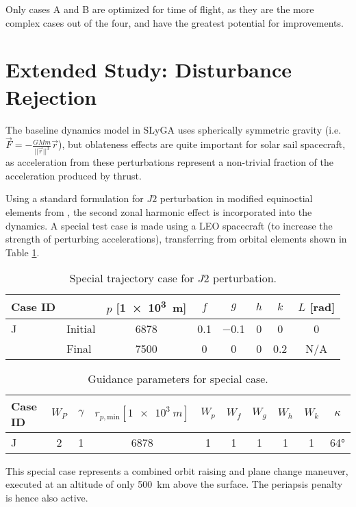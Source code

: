 Only cases A and B are optimized for time of flight, as they are the more complex cases out of the four, and have the greatest potential for improvements.

\section{Extended Study: Disturbance Rejection}
The baseline dynamics model in SLyGA uses spherically symmetric gravity (i.e. \(\vec{F} = -\frac{GMm}{||\vec{r}||^3} \vec{r}\)), but oblateness effects are quite important for solar sail spacecraft, as acceleration from these perturbations represent a non-trivial fraction of the acceleration produced by thrust.

Using a standard formulation for \(J2\) perturbation in modified equinoctial elements from \cite{nasa_mpg_moe}, the second zonal harmonic effect is incorporated into the dynamics. A special test case is made using a LEO spacecraft (to increase the strength of perturbing accelerations), transferring from orbital elements shown in Table \ref{tab:trajectory_case_J}.

\begin{table}[H]
  \centering
  \begin{tabular}{llcccccc}
    \toprule
    \textbf{Case ID} &         & \(p\) [\qty{1e3}{m}] & \(f\)     & \(g\)      & \(h\)   & \(k\)     & \(L\) [\unit{rad}] \\
    \midrule
    J                & Initial & \num{6878}           & \num{0.1} & \num{-0.1} & \num{0} & \num{0}   & \num{0}            \\
                     & Final   & \num{7500}           & \num{0}   & \num{0}    & \num{0} & \num{0.2} & N/A                \\

    \bottomrule
  \end{tabular}
  \caption{Special trajectory case for \(J2\) perturbation.}
  \label{tab:trajectory_case_J}
\end{table}

\begin{table}[H]
  \centering
  \begin{tabular}{lccccccccc}
    \toprule
    \textbf{Case ID} & \(W_P\) & \(\gamma\) & \(r_{p, \text{min}} [\qty{1e3}{m}]\) & \(W_p\) & \(W_f\) & \(W_g\) & \(W_h\) & \(W_k\) & \(\kappa\) \\
    \midrule
    J                & 2       & 1          & 6878                                 & 1       & 1       & 1       & 1       & 1       & \ang{64}   \\
    \bottomrule
  \end{tabular}
  \caption{Guidance parameters for special case.}
  \label{tab:trajectory_case_params_J}
\end{table}
This special case represents a combined orbit raising and plane change maneuver, executed at an altitude of only \qty{500}{km} above the surface. The periapsis penalty is hence also active.

